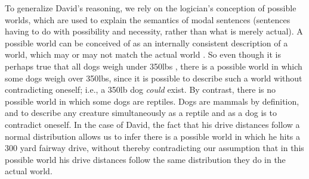 \documentclass[12pt]{article}
\begin{document}
%
To generalize David's reasoning, we rely on the logician's conception of possible worlds, which are used to explain the semantics of modal sentences (sentences having to do with possibility and necessity, rather than what is merely actual). 
%
A possible world can be conceived of as an internally consistent description of a world, which may or may not match the actual world \citep[][though for an opposing perspective see \citealp{Lewis1986}]{Adams1974}. 
%
So even though it is perhaps true that all dogs weigh under 350lbs \citep[the heaviest recorded dog weighed 343lbs;][]{Young1994}, there is a possible world in which some dogs weigh over 350lbs, since it is possible to describe such a world without contradicting oneself; i.e., a 350lb dog \textit{could} exist.
%
%
By contrast, there is no possible world in which some dogs are reptiles. 
%
Dogs are mammals by definition, and to describe any creature simultaneously as a reptile and as a dog is to contradict oneself. 
%
% 
In the case of David, the fact that his drive distances follow a normal distribution allows us to infer there is a possible world in which he hits a 300 yard fairway drive, without thereby contradicting our assumption that in this possible world his drive distances follow the same distribution they do in the actual world.
%
%
\end{document}
